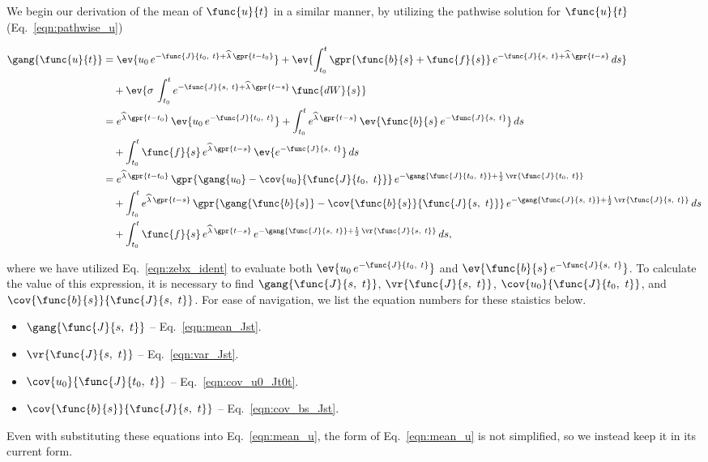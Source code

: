We begin our derivation of the mean of $\func{u}{t}$ in a similar manner, by utilizing the pathwise solution for $\func{u}{t}$ (Eq.~\ref{eqn:pathwise_u})

\begin{align}
    \gang{\func{u}{t}} &= \ev{u_0\,e^{-\func{J}{t_0,\ t} + \widehat{\lambda}\,\gpr{t - t_0}}} + \ev{\int_{t_0}^{t} \gpr{\func{b}{s} + \func{f}{s}}\,e^{-\func{J}{s,\ t} + \widehat{\lambda}\,\gpr{t - s}}\,ds}  \nonumber \\
    		&\quad + \ev{\sigma\,\int_{t_{0}}^{t} e^{-\func{J}{s,\ t} + \widehat{\lambda}\,\gpr{t - s}}\,\func{dW}{s}} \nonumber \\
    	&= e^{\widehat{\lambda}\,\gpr{t - t_0}}\,\ev{u_0\,e^{-\func{J}{t_0,\ t}}} + \int_{t_0}^{t} e^{\widehat{\lambda}\,\gpr{t - s}}\,\ev{\func{b}{s}\,e^{-\func{J}{s,\ t}}}\,ds \nonumber \\
    		&\quad + \int_{t_0}^{t} \func{f}{s}\,e^{\widehat{\lambda}\,\gpr{t - s}}\,\ev{e^{-\func{J}{s,\ t}}}\,ds \nonumber \\
    	&= e^{\widehat{\lambda}\,\gpr{t - t_0}}\,\gpr{\gang{u_0} - \cov{u_0}{\func{J}{t_0,\ t}}}\,e^{-\gang{\func{J}{t_0,\ t}} + \frac{1}{2}\,\vr{\func{J}{t_0,\ t}}} \nonumber \\
    		&\quad + \int_{t_0}^{t} e^{\widehat{\lambda}\,\gpr{t - s}}\,\gpr{\gang{\func{b}{s}} - \cov{\func{b}{s}}{\func{J}{s,\ t}}}\,e^{-\gang{\func{J}{s,\ t}} + \frac{1}{2}\,\vr{\func{J}{s,\ t}}}\,ds \nonumber \\
    		&\quad + \int_{t_0}^{t} \func{f}{s}\,e^{\widehat{\lambda}\,\gpr{t - s}}\,e^{-\gang{\func{J}{s,\ t}} + \frac{1}{2}\,\vr{\func{J}{s,\ t}}}\,ds, \label{eqn:mean_u}
\end{align}

where we have utilized Eq.~\ref{eqn:zebx_ident} to evaluate both $\ev{u_0\,e^{-\func{J}{t_0,\ t}}}$ and $\ev{\func{b}{s}\,e^{-\func{J}{s,\ t}}}$. To calculate the value of this expression, it is necessary to find $\gang{\func{J}{s,\ t}}$, $\vr{\func{J}{s,\ t}}$, $\cov{u_0}{\func{J}{t_0,\ t}}$, and $\cov{\func{b}{s}}{\func{J}{s,\ t}}$. For ease of navigation, we list the equation numbers for these staistics below.

\begin{itemize}
	\item [] $\gang{\func{J}{s,\ t}}$ -- Eq.~\ref{eqn:mean_Jst}.
	\item [] $\vr{\func{J}{s,\ t}}$ -- Eq.~\ref{eqn:var_Jst}.
	\item [] $\cov{u_0}{\func{J}{t_0,\ t}}$ -- Eq.~\ref{eqn:cov_u0_Jt0t}.
	\item [] $\cov{\func{b}{s}}{\func{J}{s,\ t}}$ -- Eq.~\ref{eqn:cov_bs_Jst}.
\end{itemize}

Even with substituting these equations into Eq.~\ref{eqn:mean_u}, the form of Eq.~\ref{eqn:mean_u} is not simplified, so we instead keep it in its current form.